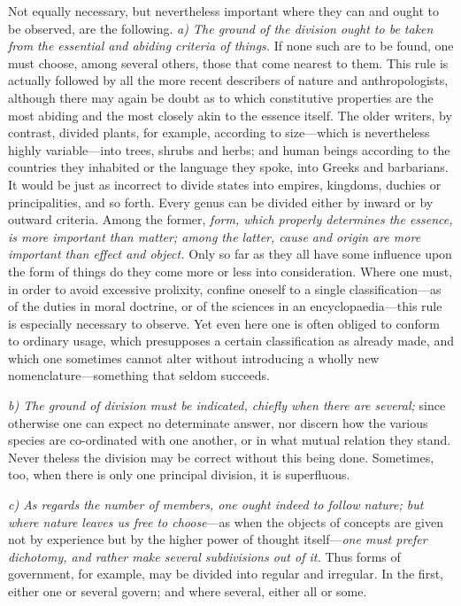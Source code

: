 \documentclass[12pt,a4paper]{article}
\begin{document}
\noindent
Not equally necessary, but nevertheless important where they can and ought to be
observed, are the following. \emph{a) The ground of the division ought to be
taken from the essential and abiding criteria of things.} If none such are to be
found, one must choose, among several others, those that come nearest to them.
This rule is actually followed by all the more recent describers of nature and
anthropologists, although there may again be doubt as to which
constitutive properties are the most abiding and the most closely akin to the
essence itself. The older writers, by contrast, divided plants, for example,
according to size---which is nevertheless highly variable---into trees, shrubs
and herbs; and human beings according to the countries they inhabited or the
language they spoke, into Greeks and barbarians. It would be just as incorrect
to divide states into empires, kingdoms, duchies or principalities, and so
forth. Every genus can be divided either by inward or by outward criteria. Among
the former, \emph{form, which properly determines the essence, is more important
than matter; among the latter, cause and origin are more important than effect
and object.} Only so far as they all have some influence upon the form of things
do they come more or less into consideration. Where one must, in order to avoid
excessive prolixity, confine oneself to a single classification---as of the
duties in moral doctrine, or of the sciences in an encyclopaedia---this rule is
especially necessary to observe. Yet even here one is often obliged to conform
to ordinary usage, which presupposes a certain classification as already made,
and which one sometimes cannot alter without introducing a wholly new
nomenclature---something that seldom succeeds.

\emph{b) The ground of division must be indicated, chiefly when there are
several;} since otherwise one can expect no determinate answer, nor discern how
the various species are co-ordinated with one another, or in what mutual
relation they stand. Never%
theless the division may be correct without this being done. Sometimes, too,
when there is only one principal division, it is superfluous.

\emph{c) As regards the number of members, one ought indeed to follow nature;
but where nature leaves us free to choose}---as when the objects of concepts are
given not by experience but by the higher power of thought
itself---\emph{one must prefer dichotomy, and rather make several subdivisions
out of it.} Thus forms of government, for example, may be divided into regular
and irregular. In the first, either one or several govern; and where several,
either all or some.
\end{document}
